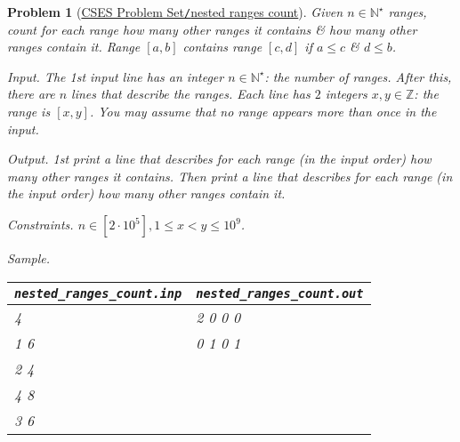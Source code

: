 \documentclass{article}
\newtheorem{problem}{Problem}
\begin{document}
\begin{problem}[\href{https://cses.fi/problemset/task/2169}{CSES Problem Set{\tt/}nested ranges count}]
    Given  $n\in\mathbb{N}^\star$ ranges, count for each range how many other ranges it contains \& how many other ranges contain it. Range $[a,b]$ contains range $[c,d]$ if $a\le c$ \& $d\le b$.
    \item {\sf Input.} The 1st input line has an integer $n\in\mathbb{N}^\star$: the number of ranges.  After this, there are $n$ lines that describe the ranges. Each line has $2$ integers $x,y\in\mathbb{Z}$: the range is $[x,y]$. You may assume that no range appears more than once in the input.
    \item {\sf Output.} 1st print a line that describes for each range (in the input order) how many other ranges it contains. Then print a line that describes for each range (in the input order) how many other ranges contain it.
    \item {\sf Constraints.} $n\in[2\cdot10^5],1\le x < y\le10^9$.
    \item {\sf Sample.}
    \begin{table}[H]
        \centering
        \begin{tabular}{|l|l|}
            \hline
            \verb|nested_ranges_count.inp| & \verb|nested_ranges_count.out| \\
            \hline
            4 & 2 0 0 0 \\
            1 6 & 0 1 0 1 \\
            2 4 & \\
            4 8 & \\
            3 6 & \\
            \hline
        \end{tabular}
    \end{table}
\end{problem}
\end{document}

